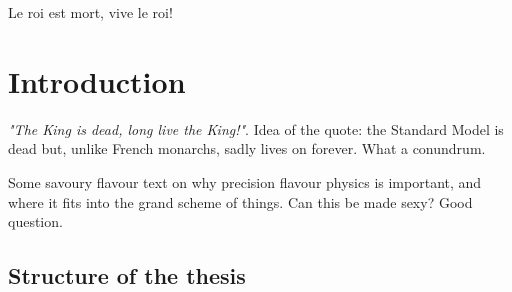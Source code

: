 \begin{savequote}[8cm]
Le roi est mort, vive le roi!
\end{savequote}

\chapter{\label{ch:1-intro}Introduction
} 

\emph{"The King is dead, long live the King!"}. Idea of the quote: the Standard Model is dead but, unlike French monarchs, sadly lives on forever. What a conundrum.


Some savoury flavour text on why precision flavour physics is important, and where it fits into the grand scheme of things. Can this be made sexy? Good question.


\section{Structure of the thesis} %
\label{sec:structure_of_the_thesis}

